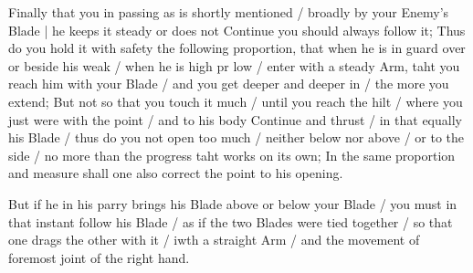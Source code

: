 
Finally that you in passing as is shortly mentioned / broadly by your
Enemy's Blade | he keeps it steady or does not Continue you should
always follow it; Thus do you hold it with safety the following
proportion, that when he is in guard over or beside his weak / when he
is high pr low / enter with a steady Arm, taht you reach him with your
Blade / and you get deeper and deeper in / the more you extend; But
not so that you touch it much / until you reach the hilt / where you
just were with the point / and to his body Continue and thrust / in
that equally his Blade / thus do you not open too much / neither below
nor above / or to the side / no more than the progress taht works on
its own; In the same proportion and measure shall one also correct the
point to his opening.


But if he in his parry brings his Blade above or below your Blade /
you must in that instant follow his Blade / as if the two Blades were
tied together / so that one drags the other with it / iwth a straight
Arm / and the movement of foremost joint of the right hand.


